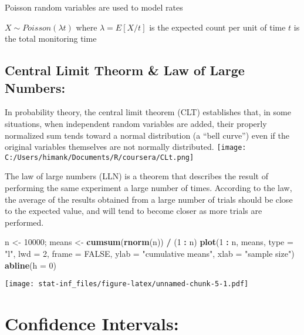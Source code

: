 \documentclass[]{article}
\newenvironment{Shaded}{\begin{snugshade}}{\end{snugshade}}
\newcommand{\DataTypeTok}[1]{\textcolor[rgb]{0.13,0.29,0.53}{#1}}
\newcommand{\DecValTok}[1]{\textcolor[rgb]{0.00,0.00,0.81}{#1}}
\newcommand{\KeywordTok}[1]{\textcolor[rgb]{0.13,0.29,0.53}{\textbf{#1}}}
\newcommand{\NormalTok}[1]{#1}
\newcommand{\OperatorTok}[1]{\textcolor[rgb]{0.81,0.36,0.00}{\textbf{#1}}}
\newcommand{\OtherTok}[1]{\textcolor[rgb]{0.56,0.35,0.01}{#1}}
\newcommand{\StringTok}[1]{\textcolor[rgb]{0.31,0.60,0.02}{#1}}
\begin{document}
Poisson random variables are used to model rates

\(X \sim Poisson(\lambda t)\) where \(\lambda = E[X / t]\) is the
expected count per unit of time \(t\) is the total monitoring time

\hypertarget{central-limit-theorm-law-of-large-numbers}{%
\subsection{Central Limit Theorm \& Law of Large
Numbers:}\label{central-limit-theorm-law-of-large-numbers}}

In probability theory, the central limit theorem (CLT) establishes that,
in some situations, when independent random variables are added, their
properly normalized sum tends toward a normal distribution (a ``bell
curve'') even if the original variables themselves are not normally
distributed.
\texttt{[image: C:/Users/himank/Documents/R/coursera/CLt.png]}

The law of large numbers (LLN) is a theorem that describes the result of
performing the same experiment a large number of times. According to the
law, the average of the results obtained from a large number of trials
should be close to the expected value, and will tend to become closer as
more trials are performed.

\begin{Shaded}
\begin{Highlighting}[]
\NormalTok{n <-}\StringTok{ }\DecValTok{10000}\NormalTok{; means <-}\StringTok{ }\KeywordTok{cumsum}\NormalTok{(}\KeywordTok{rnorm}\NormalTok{(n)) }\OperatorTok{/}\StringTok{ }\NormalTok{(}\DecValTok{1}  \OperatorTok{:}\StringTok{ }\NormalTok{n)}
\KeywordTok{plot}\NormalTok{(}\DecValTok{1} \OperatorTok{:}\StringTok{ }\NormalTok{n, means, }\DataTypeTok{type =} \StringTok{"l"}\NormalTok{, }\DataTypeTok{lwd =} \DecValTok{2}\NormalTok{, }\DataTypeTok{frame =} \OtherTok{FALSE}\NormalTok{, }\DataTypeTok{ylab =} \StringTok{"cumulative means"}\NormalTok{, }\DataTypeTok{xlab =} \StringTok{"sample size"}\NormalTok{)}
\KeywordTok{abline}\NormalTok{(}\DataTypeTok{h =} \DecValTok{0}\NormalTok{)}
\end{Highlighting}
\end{Shaded}

\texttt{[image: stat-inf\_files/figure-latex/unnamed-chunk-5-1.pdf]}

\hypertarget{confidence-intervals}{%
\section{Confidence Intervals:}\label{confidence-intervals}}
\end{document}
